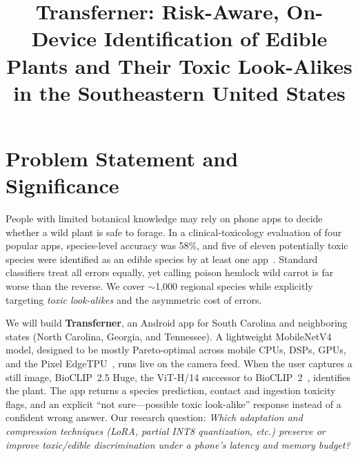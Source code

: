 \documentclass[conference,10pt]{IEEEtran}
\begin{document}

\title{Transferner: Risk-Aware, On-Device Identification of Edible Plants and Their Toxic Look-Alikes in the Southeastern United States}

\author{%
\and
{}
}
\maketitle

\section{Problem Statement and Significance}
People with limited botanical knowledge may rely on phone apps to decide whether a
wild plant is safe to forage. In a clinical-toxicology evaluation of four popular
apps, species-level accuracy was 58\%, and five of eleven potentially toxic species
were identified as an edible species by at least one app~\cite{long2023midwest}.
Standard classifiers treat all errors equally, yet calling poison hemlock wild carrot is far
worse than the reverse. We cover $\sim$1{,}000 regional species while explicitly targeting \emph{toxic
look-alikes} and the asymmetric cost of errors.

We will build \textbf{Transferner}, an Android app for South Carolina and neighboring
states (North Carolina, Georgia, and Tennessee). A lightweight MobileNetV4 model, designed to be mostly Pareto-optimal across mobile CPUs,
DSPs, GPUs, and the Pixel EdgeTPU~\cite{qin2024mobilenetv4}, runs live on the camera feed. When the user captures a still image, BioCLIP~2.5
Huge, the ViT-H/14 successor to BioCLIP~2~\cite{gu2025bioclip2}, identifies the plant. The app returns a species
prediction, contact and ingestion toxicity flags, and an explicit ``not sure---possible toxic look-alike''
response instead of a confident wrong answer. Our research question:
\emph{Which adaptation and compression techniques (LoRA, partial INT8 quantization,
etc.) preserve or improve toxic/edible discrimination under a phone's latency and
memory budget?}

\end{document}
